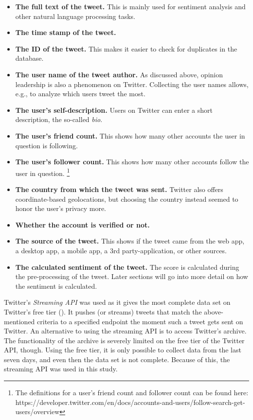 \begin{itemize}
\item \textbf{The full text of the tweet.} This is mainly used for sentiment analysis and other natural language processing tasks.
\item \textbf{The time stamp of the tweet.}
\item \textbf{The ID of the tweet.} This makes it easier to check for duplicates in the database. 
\item \textbf{The user name of the tweet author.} As discussed above, opinion leadership is also a phenomenon on Twitter. Collecting the user names allows, e.g., to analyze which users tweet the most.
\item \textbf{The user's self-description.} Users on Twitter can enter a short description, the so-called \emph{bio}.
\item \textbf{The user's friend count.} This shows how many other accounts the user in question is following.
\item \textbf{The user's follower count.} This shows how many other accounts follow the user in question. \footnote{The definitions for a user's friend count and follower count can be found here: https://developer.twitter.com/en/docs/accounts-and-users/follow-search-get-users/overview}
\item \textbf{The country from which the tweet was sent.} Twitter also offers coordinate-based geolocations, but choosing the country instead seemed to honor the user's privacy more.
\item \textbf{Whether the account is verified or not.}
\item \textbf{The source of the tweet.} This shows if the tweet came from the web app, a desktop app, a mobile app, a 3rd party-application, or other sources.
\item \textbf{The calculated sentiment of the tweet.} The score is calculated during the pre-processing of the tweet. Later sections will go into more detail on how the sentiment is calculated.
\end{itemize}


Twitter's \emph{Streaming API} was used as it gives the most complete data set on Twitter's free tier (\cite{bruns2014}). It pushes (or streams) tweets that match the above-mentioned criteria to a specified endpoint the moment such a tweet gets sent on Twitter. An alternative to using the streaming API is to access Twitter's archive. The functionality of the archive is severely limited on the free tier of the Twitter API, though. Using the free tier, it is only possible to collect data from the last seven days, and even then the data set is not complete. Because of this, the streaming API was used in this study.

